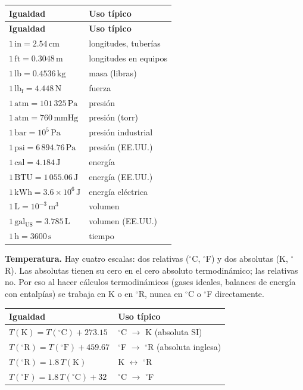 \renewcommand{\arraystretch}{1.4}
\begin{longtable}{|L{5cm}|L{6cm}|}
\hline
\textbf{Igualdad} & \textbf{Uso típico} \\
\hline
\endfirsthead
\hline
\textbf{Igualdad} & \textbf{Uso típico} \\
\hline
\endhead
\endlastfoot

$1\,\mathrm{in} = 2.54\,\mathrm{cm}$ & longitudes, tuberías \\
\hline
$1\,\mathrm{ft} = 0.3048\,\mathrm{m}$ & longitudes en equipos \\
\hline
$1\,\mathrm{lb} = 0.4536\,\mathrm{kg}$ & masa (libras) \\
\hline
$1\,\mathrm{lb_f} = 4.448\,\mathrm{N}$ & fuerza \\
\hline
$1\,\mathrm{atm} = 101\,325\,\mathrm{Pa}$ & presión \\
\hline
$1\,\mathrm{atm} = 760\,\mathrm{mmHg}$ & presión (torr) \\
\hline
$1\,\mathrm{bar} = 10^5\,\mathrm{Pa}$ & presión industrial \\
\hline
$1\,\mathrm{psi} = 6\,894.76\,\mathrm{Pa}$ & presión (EE.UU.) \\
\hline
$1\,\mathrm{cal} = 4.184\,\mathrm{J}$ & energía \\
\hline
$1\,\mathrm{BTU} = 1\,055.06\,\mathrm{J}$ & energía (EE.UU.) \\
\hline
$1\,\mathrm{kWh} = 3.6\times 10^6\,\mathrm{J}$ & energía eléctrica \\
\hline
$1\,\mathrm{L} = 10^{-3}\,\mathrm{m^3}$ & volumen \\
\hline
$1\,\mathrm{gal_{US}} = 3.785\,\mathrm{L}$ & volumen (EE.UU.) \\
\hline
$1\,\mathrm{h} = 3600\,\mathrm{s}$ & tiempo \\

\end{longtable}
\renewcommand{\arraystretch}{1}

\textbf{Temperatura.} Hay cuatro escalas: dos relativas ($^\circ$C,
$^\circ$F) y dos absolutas (K, $^\circ$R). Las absolutas tienen su
cero en el cero absoluto termodinámico; las relativas no. Por eso al
hacer cálculos termodinámicos (gases ideales, balances de energía con
entalpías) se trabaja en K o en $^\circ$R, nunca en $^\circ$C o
$^\circ$F directamente.

\begin{center}
\renewcommand{\arraystretch}{1.4}
\begin{tabular}{|L{6cm}|L{5cm}|}
\hline
\textbf{Igualdad} & \textbf{Uso típico} \\
\hline
$T(\mathrm{K}) = T(^\circ\mathrm{C}) + 273.15$ & $^\circ$C $\to$ K (absoluta SI) \\
\hline
$T(^\circ\mathrm{R}) = T(^\circ\mathrm{F}) + 459.67$ & $^\circ$F $\to$ $^\circ$R (absoluta inglesa) \\
\hline
$T(^\circ\mathrm{R}) = 1.8\,T(\mathrm{K})$ & K $\leftrightarrow$ $^\circ$R \\
\hline
$T(^\circ\mathrm{F}) = 1.8\,T(^\circ\mathrm{C}) + 32$ & $^\circ$C $\to$ $^\circ$F \\
\hline
\end{tabular}
\end{center}

